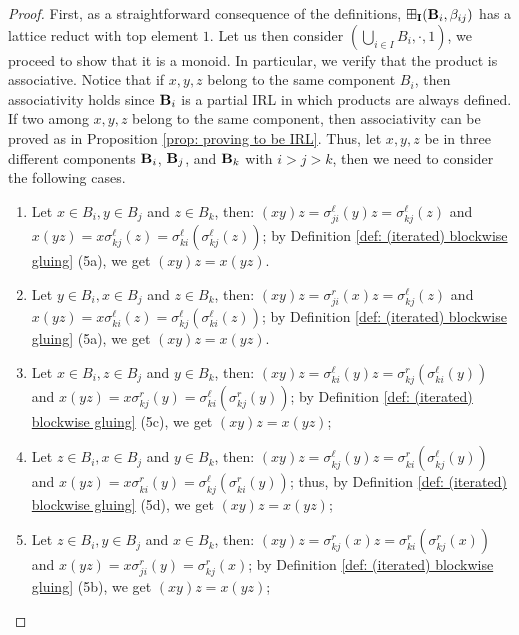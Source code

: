 \documentclass{amsart}
\theoremstyle{definition}
\numberwithin{equation}{section}
\newcommand{\alg}[1]{{\textbf{\upshape #1}}}  %
\newcommand{\Sell}[2]{\sigma^\ell_{#1#2}}
\newcommand{\Sellx}[3]{\sigma^\ell_{#1#2}(#3)}
\newcommand{\Srx}[3]{\sigma^r_{#1#2}(#3)}
\newcommand{\betaij}{\beta_{ij}}
\begin{document}
\begin{proof}
	First, as a straightforward consequence of the definitions, $\boxplus_{\bf I}(\alg B_{i}, \betaij)$ has a lattice reduct with top element $1$. Let us then consider $(\bigcup_{i \in { I}} B_i, \cdot, 1)$, we proceed to show that it is a monoid. In particular, we verify that the product is associative. Notice that if $x,y,z$ belong to the same component $B_i$, then associativity holds since $\alg B_i$ is a partial IRL in which products are always defined. If two among $x,y,z$ belong to the same component, then associativity can be proved as in Proposition \ref{prop: proving to be IRL}. Thus, let $x,y,z$ be in three different components $\alg B_i$, $\alg B_j$, and $\alg B_k$ with $i>j>k$, then we need to consider the following cases. 
	\begin{enumerate}
		\item Let $x \in B_i, y \in B_j$ and $z \in B_k$, then: 
		 $(xy)z=\Sellx j i y z=\Sellx k j z$ and $x(yz)=x \Sellx k j z=\Sellx{k}{i}{\Sellx{k}{j}{z}}$; by Definition \ref{def: (iterated) blockwise gluing} (5a), we get $(xy)z=x(yz)$.		
		\item Let $y \in B_i, x \in B_j$ and $z \in  B_k$, then: 
	$(xy)z=\Srx j i x z=\Sellx k j z$ and $x(yz)= x \Sellx k i z=\Sellx k j {\Sellx k i z}$; by Definition \ref{def: (iterated) blockwise gluing} (5a), we get $(xy)z=x(yz)$. 
	
		\item Let $x \in  B_i, z \in B_j$ and $y \in B_k$, then: 
		 $(xy)z=\Sellx k i y z=\Srx k j {\Sellx k i y}$ and $x(yz)= x \Srx k j y=\Sellx k i {\Srx k j y}$; by Definition \ref{def: (iterated) blockwise gluing} (5c), we get $(xy)z=x(yz)$;
		
		\item Let $z \in  B_i, x \in B_j$ and $y \in B_k$, then: 
		 $(xy)z=\Sellx k j y z= \Srx k i {\Sellx k j y}$ and $x(yz)= x \Srx k i y=\Sell k j ({\Srx k i y})$; thus, by Definition \ref{def: (iterated) blockwise gluing} (5d), we get $(xy)z=x(yz)$; 
		
		\item Let $z \in B_i, y \in B_j$ and $x \in B_k$, then: 
		 $(xy)z=\Srx k j x z=\Srx k i {\Srx k j x}$ and $x(yz)= x \Srx j i y= \Srx k j x $; by Definition \ref{def: (iterated) blockwise gluing} (5b), we get $(xy)z=x(yz)$; 
		

\end{enumerate}
\end{proof}
\end{document}
